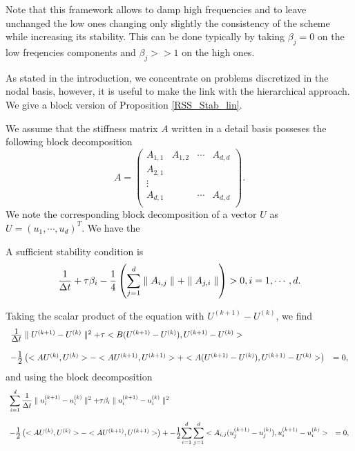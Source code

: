 {Note that this framework allows to damp high frequencies and to leave unchanged the low ones changing only slightly the consistency of the scheme while increasing its stability. This can be done typically by taking $\beta_j=0$ on the low freqencies components and $\beta_j >>1$ on the high ones.

As stated in the introduction, we concentrate on problems discretized in the nodal basis, however, it is useful to make the link with the hierarchical approach. We give a block version of Proposition \ref{RSS_Stab_lin}.


We assume that the stiffness matrix $A$ written in a detail basis posseses the following block decomposition
$$
A=\left(
\begin{array}{cccc}
A_{1,1} & A_{1,2}&\cdots & A_{d,d}\\
A_{2,1} &  & & \\
\vdots & &  &\\
 A_{d,1}& & \cdots &A_{d,d}\\
\end{array}
\right).
$$
We note the corresponding  block decomposition of a vector $U$ as $U=(u_1,\cdots, u_d)^T$.
We have the
\begin{theorem_amiens}
A sufficient stability condition is
$$
\Frac{1}{\Delta t}   +\tau \beta_i -\Frac{1}{4}\left(\sum_{j=1}^d\parallel A_{i,j}\parallel  +\parallel A_{j,i}\parallel\right)
>0, i=1,\cdots, d.
$$
\end{theorem_amiens}
\begin{proof_amiens}
Taking the scalar product of the equation with $U^{(k+1)}-U^{(k)}$, we find
$$
\begin{array}{ll}
\Frac{1}{\Delta t} \parallel U^{(k+1)}-U^{(k)} \parallel^2
+\tau <B(U^{(k+1)}-U^{(k)}),U^{(k+1)}-U^{(k)}> & \\
&\\
-\Frac{1}{2}\left(<AU^{(k)},U^{(k)}> -<AU^{(k+1)},U^{(k+1)}>+
<A(U^{(k+1)}-U^{(k)}),U^{(k+1)}-U^{(k)}>\right)&=0,\\
\end{array}
$$
and using the block decomposition
$$
\begin{array}{ll}
\displaystyle{\sum_{i=1}^d\Frac{1}{\Delta t} \parallel u_i^{(k+1)}-u_i^{(k)} \parallel^2
+\tau \beta_i \parallel u_i^{(k+1)}-u_i^{(k)} \parallel^2} & \\
&\\
-\Frac{1}{2}\left(<AU^{(k)},U^{(k)}> -<AU^{(k+1)},U^{(k+1)}>\right)+
-\Frac{1}{2}\displaystyle{\sum_{i=1}^d\sum_{j=1}^d<A_{i,j}(u_j^{(k+1)}-u_j^{(k)}),u_i^{(k+1)}-u_i^{(k)}>}&=0,\\

\end{array}$$
\end{proof_amiens}}
